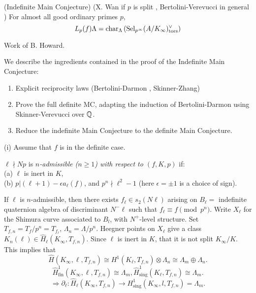 \documentclass[12pt,amsfont]{amsart}
\begin{document}
\begin{dfn} (Indefinite Main Conjecture) (X. Wan if $p$ is split , Bertolini-Verevucci in general ) For almost all good ordinary primes $p$, 
\[L_p(f) \Lambda = \operatorname{char}_\Lambda\left(\operatorname{Sel}_{p^\infty}(A/K_\infty)_{\operatorname{tors}}^\vee\right)\]
\end{dfn}

\begin{rmk} Work of B. Howard. 
\end{rmk}

We describe the ingredients contained in the proof of the Indefinite Main Conjecture:  
\begin{enumerate}
\item 
Explicit reciprocity laws (Bertolini-Darmon , Skinner-Zhang)
\item 
Prove the full definite MC, adapting the induction of Bertolini-Darmon using Skinner-Verevucci over ${\mathbb Q}$.
\item 
Reduce the indefinite Main Conjecture to the definite Main Conjecture.  
\end{enumerate}

(i) Assume that $f$ is in the definite case. 
\begin{dfn} $\ell \nmid Np$ is \emph{$n$-admissible ($n \geq 1$) with respect to $(f, K, p)$} if: \\
(a) $\ell$ is inert in $K$, \\
(b) $p | (\ell+1) - \epsilon a_\ell(f)$, and $p^n \nmid \ell^2 - 1$ (here $\epsilon = \pm 1$ is a choice of sign).
\end{dfn}

If $\ell$ is $n$-admissible, then there exists $f_\ell \in s_2(N\ell)$ arising on $B_\ell =$ indefinite quaternion algebra of discriminant $N^{-} \ell$ such that $f_\ell \equiv f \pmod{p^n}$. Write $X_\ell$ for the Shimura curve associated to $B_l$, with $N^+$-level structure. Set $T_{f,n} = T_f / p^n = T_{f_\ell}$, $\Lambda_n = \Lambda / p^n$. Heegner points on $X_\ell$ give a class $K_n(\ell) \in \widehat{H}_\ell(K_\infty, T_{f,n}).$ Since $\ell$ is inert in $K$, that it is not split $K_\infty / K$. This implies that
\[\widehat{H}(K_\infty, \ell, T_{f,n}) \cong H^1(K_\ell, T_{f,n}) \otimes \Lambda_n \cong \Lambda_m \oplus \Lambda_n. \]
\[\widehat{H}_{\text{fin}}^1 (K_\infty, \ell, T_{f,n}) \cong \Lambda_m, \widehat{H}_{\text{sing}}^1 (K_ \ell, T_{f,n}) \cong \Lambda_m.\]
\[\Rightarrow \partial_ \ell: \widehat{H}_ \ell(K_\infty, T_{f,n}) \rightarrow H_{\text{sing}}^1(K_\infty, l, T_{f,n}) = \Lambda_m.\]
\end{document}
